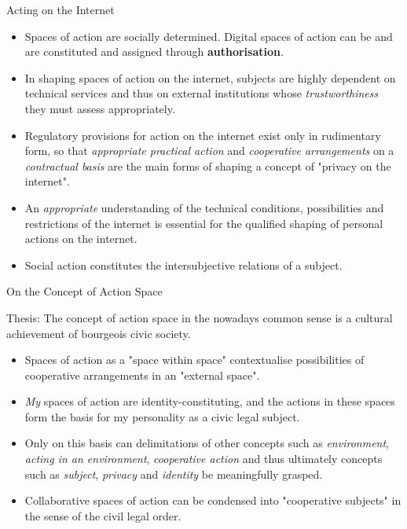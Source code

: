 \documentclass{beamer}
\begin{document}
\begin{frame}{Acting on the Internet}\small
\begin{itemize}
\item Spaces of action are socially determined. Digital spaces of action can
  be and are constituted and assigned through \textbf{authorisation}.
\item In shaping spaces of action on the internet, subjects are highly
  dependent on technical services and thus on external institutions whose
  \emph{trustworthiness} they must assess appropriately.
\item Regulatory provisions for action on the internet exist only in
  rudimentary form, so that \emph{appropriate practical action} and
  \emph{cooperative arrangements} on a \emph{contractual basis} are the main
  forms of shaping a concept of "privacy on the internet".
\item An \emph{appropriate} understanding of the technical conditions,
  possibilities and restrictions of the internet is essential for the
  qualified shaping of personal actions on the internet.
\item Social action constitutes the intersubjective relations of a subject.
\end{itemize}
\end{frame}
\begin{frame}{On the Concept of Action Space}
  \begin{block}{Thesis:}
    The concept of action space in the nowadays common sense is a cultural
    achievement of bourgeois civic society.
  \end{block}\small
\begin{itemize}
\item Spaces of action as a "space within space" contextualise possibilities
  of cooperative arrangements in an "external space".
\item \emph{My} spaces of action are identity-constituting, and the actions in
  these spaces form the basis for my personality as a civic legal subject.
\item Only on this basis can delimitations of other concepts such as
  \emph{environment}, \emph{acting in an environment}, \emph{cooperative
    action} and thus ultimately concepts such as \emph{subject},
  \emph{privacy} and \emph{identity} be meaningfully grasped.
\item Collaborative spaces of action can be condensed into "cooperative
  subjects" in the sense of the civil legal order.
\end{itemize}
\end{frame}
\end{document}
